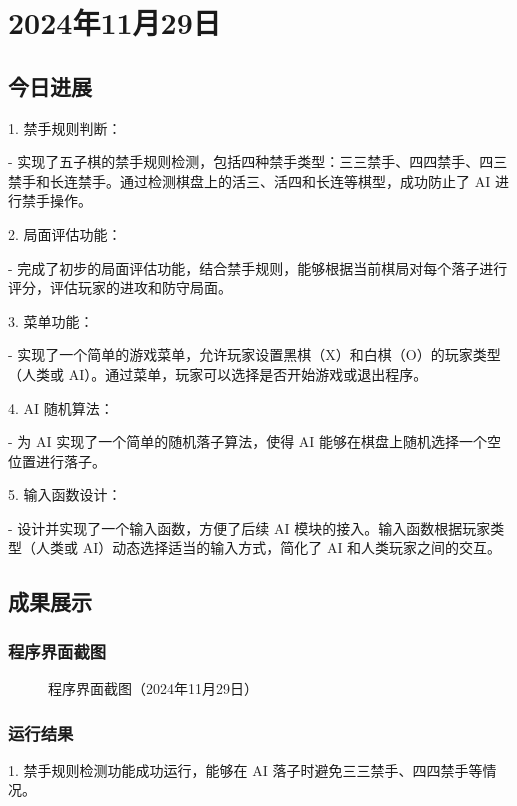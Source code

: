 \section{2024年11月29日} %

\subsection{今日进展} %
1. 禁手规则判断：

   - 实现了五子棋的禁手规则检测，包括四种禁手类型：三三禁手、四四禁手、四三禁手和长连禁手。通过检测棋盘上的活三、活四和长连等棋型，成功防止了 AI 进行禁手操作。

2. 局面评估功能：

   - 完成了初步的局面评估功能，结合禁手规则，能够根据当前棋局对每个落子进行评分，评估玩家的进攻和防守局面。

3. 菜单功能：

   - 实现了一个简单的游戏菜单，允许玩家设置黑棋（X）和白棋（O）的玩家类型（人类或 AI）。通过菜单，玩家可以选择是否开始游戏或退出程序。

4. AI 随机算法：

   - 为 AI 实现了一个简单的随机落子算法，使得 AI 能够在棋盘上随机选择一个空位置进行落子。

5. 输入函数设计：

   - 设计并实现了一个输入函数，方便了后续 AI 模块的接入。输入函数根据玩家类型（人类或 AI）动态选择适当的输入方式，简化了 AI 和人类玩家之间的交互。

\subsection{成果展示} %

\subsubsection{程序界面截图}
\begin{figure}[h]
    \centering
    \caption{程序界面截图（2024年11月29日）}
    \label{fig:program_output}
\end{figure}

\subsubsection{运行结果}
1. 禁手规则检测功能成功运行，能够在 AI 落子时避免三三禁手、四四禁手等情况。

